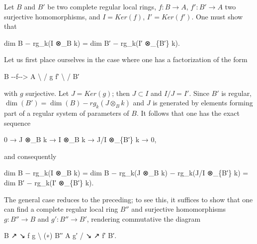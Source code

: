 \documentclass[
]{article}
\newenvironment{Shaded}{}{}
\newcommand{\NormalTok}[1]{#1}
\begin{document}
Let \(B\) and \(B'\) be two complete regular local rings,
\(f : B \to A\), \(f' : B' \to A\) two surjective homomorphisms, and
\(I = Ker(f)\), \(I' = Ker(f')\). One must show that

\begin{Shaded}
\begin{Highlighting}[]
\NormalTok{dim B − rg\_k(I ⊗\_B k) = dim B′ − rg\_k(I′ ⊗\_\{B′\} k).}
\end{Highlighting}
\end{Shaded}

Let us first place ourselves in the case where one has a factorization
of the form

\begin{Shaded}
\begin{Highlighting}[]
\NormalTok{B {-}{-}f{-}{-}\textgreater{} A}
\NormalTok{ \textbackslash{}      /}
\NormalTok{  g    f′}
\NormalTok{   \textbackslash{}  /}
\NormalTok{    B′}
\end{Highlighting}
\end{Shaded}

with \(g\) surjective. Let \(J = Ker(g)\); then \(J \subset I\) and
\(I/J = I'\). Since \(B'\) is regular,
\(\dim(B') = \dim(B) - rg_{k}(J \otimes_{B} k)\) and \(J\) is generated
by elements forming part of a regular system of parameters of \(B\). It
follows that one has the exact sequence

\begin{Shaded}
\begin{Highlighting}[]
\NormalTok{0 → J ⊗\_B k → I ⊗\_B k → J/I ⊗\_\{B′\} k → 0,}
\end{Highlighting}
\end{Shaded}

and consequently

\begin{Shaded}
\begin{Highlighting}[]
\NormalTok{dim B − rg\_k(I ⊗\_B k) = dim B − rg\_k(J ⊗\_B k) − rg\_k(J/I ⊗\_\{B′\} k) = dim B′ − rg\_k(I′ ⊗\_\{B′\} k).}
\end{Highlighting}
\end{Shaded}

The general case reduces to the preceding; to see this, it suffices to
show that one can find a complete regular local ring \(B''\) and
surjective homomorphisms \(g : B'' \to B\) and \(g' : B'' \to B'\),
rendering commutative the diagram

\begin{Shaded}
\begin{Highlighting}[]
\NormalTok{                  B}
\NormalTok{                ↗    ↘ f}
\NormalTok{              g        \textbackslash{}}
\NormalTok{(∗)      B′′            A}
\NormalTok{              g′       /}
\NormalTok{                ↘    ↗ f′}
\NormalTok{                  B′.}
\end{Highlighting}
\end{Shaded}
\end{document}

